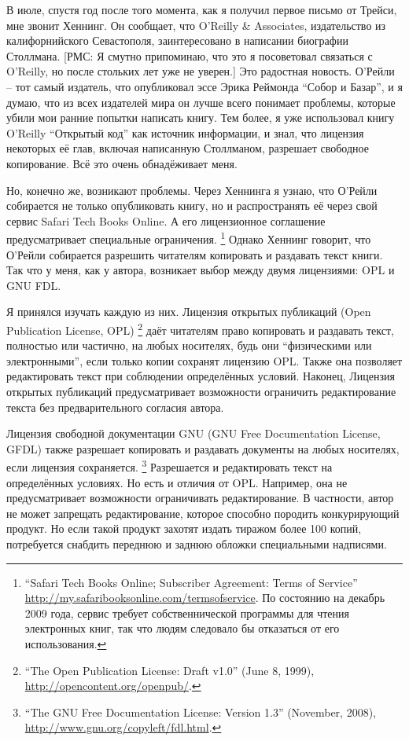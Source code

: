 В июле, спустя год после того момента, как я получил первое письмо от Трейси, мне звонит Хеннинг. Он сообщает, что O'Reilly \& Associates, издательство из калифорнийского Севастополя, заинтересовано в написании биографии Столлмана. [РМС: Я смутно припоминаю, что это я посоветовал связаться с O'Reilly, но после стольких лет уже не уверен.] Это радостная новость. О'Рейли -- тот самый издатель, что опубликовал эссе Эрика Реймонда \enquote{Собор и Базар}, и я думаю, что из всех издателей мира он лучше всего понимает проблемы, которые убили мои ранние попытки написать книгу. Тем более, я уже использовал книгу O'Reilly \enquote{Открытый код} как источник информации, и знал, что лицензия некоторых её глав, включая написанную Столлманом, разрешает свободное копирование. Всё это очень обнадёживает меня.

Но, конечно же, возникают проблемы. Через Хеннинга я узнаю, что О'Рейли собирается не только опубликовать книгу, но и распространять её через свой сервис Safari Tech Books Online. А его лицензионное соглашение предусматривает специальные ограничения. \footnote{\enquote{Safari Tech Books Online; Subscriber Agreement: Terms of Service} \url{http://my.safaribooksonline.com/termsofservice}. По состоянию на декабрь 2009 года, сервис требует собственнической программы для чтения электронных книг, так что людям следовало бы отказаться от его использования.} Однако Хеннинг говорит, что О'Рейли собирается разрешить читателям копировать и раздавать текст книги. Так что у меня, как у автора, возникает выбор между двумя лицензиями: OPL и GNU FDL.

Я принялся изучать каждую из них. Лицензия открытых публикаций (Open Publication License, OPL) \footnote{\enquote{The Open Publication License: Draft v1.0} (June 8, 1999), \url{http://opencontent.org/openpub/}.} даёт читателям право копировать и раздавать текст, полностью или частично, на любых носителях, будь они \enquote{физическими или электронными}, если только копии сохранят лицензию OPL. Также она позволяет редактировать текст при соблюдении определённых условий. Наконец, Лицензия открытых публикаций предусматривает возможности ограничить редактирование текста без предварительного согласия автора.

Лицензия свободной документации GNU (GNU Free Documentation License, GFDL) также разрешает копировать и раздавать документы на любых носителях, если лицензия сохраняется. \footnote{\enquote{The GNU Free Documentation License: Version 1.3} (November, 2008), \url{http://www.gnu.org/copyleft/fdl.html}.} Разрешается и редактировать текст на определённых условиях. Но есть и отличия от OPL. Например, она не предусматривает возможности ограничивать редактирование. В частности, автор не может запрещать редактирование, которое способно породить конкурирующий продукт. Но если такой продукт захотят издать тиражом более 100 копий, потребуется снабдить переднюю и заднюю обложки специальными надписями.

